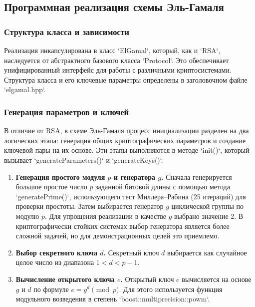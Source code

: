 \subsection{Программная реализация схемы Эль-Гамаля}

\subsubsection{Структура класса и зависимости}
Реализация инкапсулирована в класс `ElGamal`, который, как и `RSA`, наследуется от абстрактного базового класса `Protocol`. Это обеспечивает унифицированный интерфейс для работы с различными криптосистемами. Структура класса и его ключевые параметры определены в заголовочном файле `elgamal.hpp`.



\subsubsection{Генерация параметров и ключей}
В отличие от RSA, в схеме Эль-Гамаля процесс инициализации разделен на два логических этапа: генерация общих криптографических параметров и создание ключевой пары на их основе. Эти этапы выполняются в методе `init()`, который вызывает `generateParameters()` и `generateKeys()`.

\begin{enumerate}
    \item \textbf{Генерация простого модуля $p$ и генератора $g$.} Сначала генерируется большое простое число $p$ заданной битовой длины с помощью метода `generatePrime()`, использующего тест Миллера–Рабина (25 итераций) для проверки простоты. Затем выбирается генератор $g$ циклической группы по модулю $p$. Для упрощения реализации в качестве $g$ выбрано значение 2. В криптографически стойких системах выбор генератора является более сложной задачей, но для демонстрационных целей это приемлемо.
    
    \item \textbf{Выбор секретного ключа $d$.} Секретный ключ $d$ выбирается как случайное целое число из диапазона $1 < d < p-1$.
    
    \item \textbf{Вычисление открытого ключа $e$.} Открытый ключ $e$ вычисляется на основе $g$ и $d$ по формуле $e = g^d \pmod p$. Для этого используется функция модульного возведения в степень `boost::multiprecision::powm`.
\end{enumerate}

